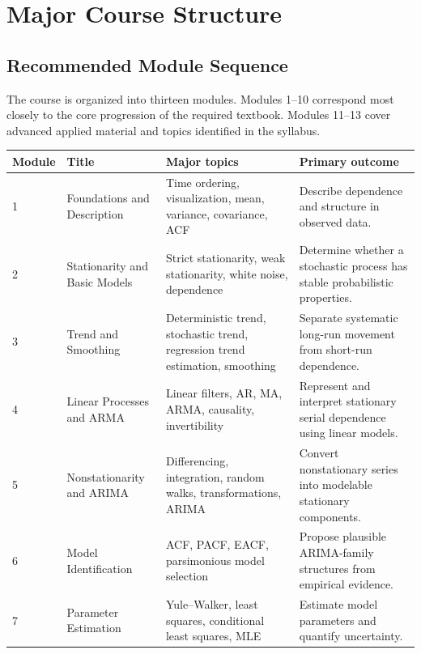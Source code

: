 \documentclass[11pt]{article}
\begin{document}
\section{Major Course Structure}

\subsection{Recommended Module Sequence}

The course is organized into thirteen modules. Modules 1--10 correspond most
closely to the core progression of the required textbook. Modules 11--13 cover
advanced applied material and topics identified in the syllabus.

\begin{longtable}{p{} p{} p{} p{}}
\toprule
\textbf{Module} & \textbf{Title} & \textbf{Major topics} & \textbf{Primary outcome} \\
\midrule
\endhead

1 & Foundations and Description &
Time ordering, visualization, mean, variance, covariance, ACF &
Describe dependence and structure in observed data. \\

2 & Stationarity and Basic Models &
Strict stationarity, weak stationarity, white noise, dependence &
Determine whether a stochastic process has stable probabilistic properties. \\

3 & Trend and Smoothing &
Deterministic trend, stochastic trend, regression trend estimation, smoothing &
Separate systematic long-run movement from short-run dependence. \\

4 & Linear Processes and ARMA &
Linear filters, AR, MA, ARMA, causality, invertibility &
Represent and interpret stationary serial dependence using linear models. \\

5 & Nonstationarity and ARIMA &
Differencing, integration, random walks, transformations, ARIMA &
Convert nonstationary series into modelable stationary components. \\

6 & Model Identification &
ACF, PACF, EACF, parsimonious model selection &
Propose plausible ARIMA-family structures from empirical evidence. \\

7 & Parameter Estimation &
Yule--Walker, least squares, conditional least squares, MLE &
Estimate model parameters and quantify uncertainty. \\


\end{longtable}
\end{document}
